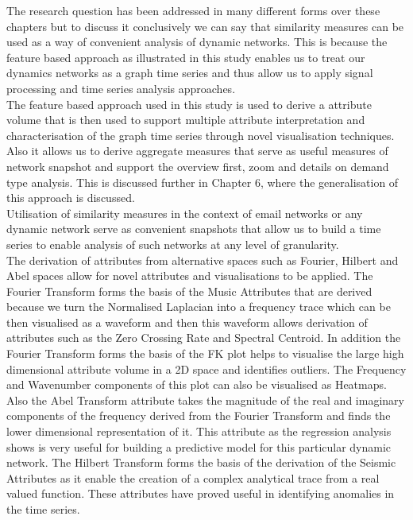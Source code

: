 The research question has been addressed in many different forms over these chapters but to discuss it conclusively we can say that similarity measures can be used as a way of convenient analysis of dynamic networks. This is because the feature based approach as illustrated in this study enables us to treat our dynamics networks as a graph time series and thus allow us to apply signal processing and time series analysis approaches. \\

The feature based approach used in this study is used to derive a attribute volume that is then used to support multiple attribute interpretation and characterisation of the graph time series through novel visualisation techniques. Also it allows us to derive aggregate measures that serve as useful measures of network snapshot and support the overview first, zoom and details on demand type analysis. This is discussed further in Chapter 6, where the generalisation of this approach is discussed. \\

Utilisation of similarity measures in the context of email networks or any dynamic network serve as convenient snapshots that allow us to build a time series to enable analysis of such networks at any level of granularity. \\

The derivation of attributes from alternative spaces such as Fourier, Hilbert and Abel spaces allow for novel attributes and visualisations to be applied. The Fourier Transform forms the basis of the Music Attributes that are derived because we turn the Normalised Laplacian into a frequency trace which can be then visualised as a waveform and then this waveform allows derivation of attributes such as the Zero Crossing Rate and Spectral Centroid. In addition the Fourier Transform forms the basis of the FK plot helps to visualise the large high dimensional attribute volume in a 2D space and identifies outliers. The Frequency and Wavenumber components of this plot can also be visualised as Heatmaps. Also the Abel Transform attribute takes the magnitude of the real and imaginary components of the frequency derived from the Fourier Transform and finds the lower dimensional representation of it. This attribute as the regression analysis shows is very useful for building a predictive model for this particular dynamic network. The Hilbert Transform forms the basis of the derivation of the Seismic Attributes as it enable the creation of a complex analytical trace from a real valued function. These attributes have proved useful in identifying anomalies in the time series. \\

